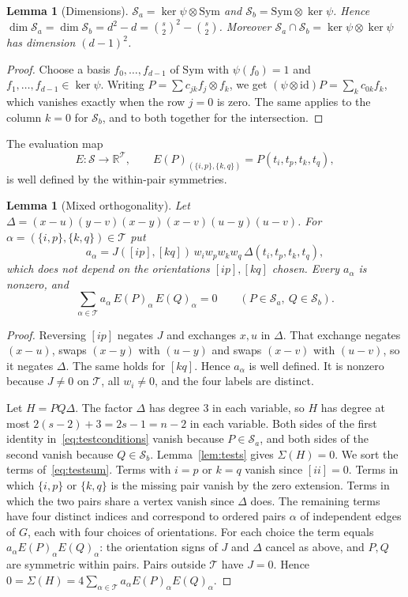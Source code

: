 \documentclass[11pt,a4paper]{article}
\newtheorem{lemma}[theorem]{Lemma}
\theoremstyle{definition}
\theoremstyle{remark}
\numberwithin{equation}{section}
\newcommand{\R}{\mathbb R}
\newcommand{\SSS}{\mathcal S}
\newcommand{\TT}{\mathcal T}
\newcommand{\Sym}{\mathrm{Sym}}
\begin{document}
\begin{lemma}[Dimensions]\label{lem:dim}
$\SSS_a=\ker\psi\otimes\Sym$ and $\SSS_b=\Sym\otimes\ker\psi$. Hence $\dim\SSS_a=\dim\SSS_b=d^2-d=\binom s2^2-\binom s2$. Moreover $\SSS_a\cap\SSS_b=\ker\psi\otimes\ker\psi$ has dimension $(d-1)^2$.
\end{lemma}

\begin{proof}
Choose a basis $f_0,\dots,f_{d-1}$ of $\Sym$ with $\psi(f_0)=1$ and $f_1,\dots,f_{d-1}\in\ker\psi$. Writing $P=\sum c_{jk}f_j\otimes f_k$, we get $(\psi\otimes\mathrm{id})P=\sum_kc_{0k}f_k$, which vanishes exactly when the row $j=0$ is zero. The same applies to the column $k=0$ for $\SSS_b$, and to both together for the intersection.
\end{proof}

The evaluation map
\[
E:\SSS\to\R^{\TT},\qquad E(P)_{(\{i,p\},\{k,q\})}=P(t_i,t_p,t_k,t_q),
\]
is well defined by the within-pair symmetries.

\begin{lemma}[Mixed orthogonality]\label{lem:mixed}
Let $\Delta=(x-u)(y-v)(x-y)(x-v)(u-y)(u-v)$. For $\alpha=(\{i,p\},\{k,q\})\in\TT$ put
\[
a_\alpha=J([ip],[kq])\,w_iw_pw_kw_q\,\Delta(t_i,t_p,t_k,t_q),
\]
which does not depend on the orientations $[ip],[kq]$ chosen. Every $a_\alpha$ is nonzero, and
\begin{equation}\label{eq:mixed}
\sum_{\alpha\in\TT}a_\alpha\,E(P)_\alpha\,E(Q)_\alpha=0\qquad(P\in\SSS_a,\ Q\in\SSS_b).
\end{equation}
\end{lemma}

\begin{proof}
Reversing $[ip]$ negates $J$ and exchanges $x,u$ in $\Delta$. That exchange negates $(x-u)$, swaps $(x-y)$ with $(u-y)$ and swaps $(x-v)$ with $(u-v)$, so it negates $\Delta$. The same holds for $[kq]$. Hence $a_\alpha$ is well defined. It is nonzero because $J\ne0$ on $\TT$, all $w_i\ne0$, and the four labels are distinct.

Let $H=PQ\Delta$. The factor $\Delta$ has degree $3$ in each variable, so $H$ has degree at most $2(s-2)+3=2s-1=n-2$ in each variable. Both sides of the first identity in~\eqref{eq:testconditions} vanish because $P\in\SSS_a$, and both sides of the second vanish because $Q\in\SSS_b$. Lemma~\ref{lem:tests} gives $\Sigma(H)=0$. We sort the terms of~\eqref{eq:testsum}. Terms with $i=p$ or $k=q$ vanish since $[ii]=0$. Terms in which $\{i,p\}$ or $\{k,q\}$ is the missing pair vanish by the zero extension. Terms in which the two pairs share a vertex vanish since $\Delta$ does. The remaining terms have four distinct indices and correspond to ordered pairs $\alpha$ of independent edges of $G$, each with four choices of orientations. For each choice the term equals $a_\alpha E(P)_\alpha E(Q)_\alpha$: the orientation signs of $J$ and $\Delta$ cancel as above, and $P,Q$ are symmetric within pairs. Pairs outside $\TT$ have $J=0$. Hence $0=\Sigma(H)=4\sum_{\alpha\in\TT}a_\alpha E(P)_\alpha E(Q)_\alpha$.
\end{proof}
\end{document}
